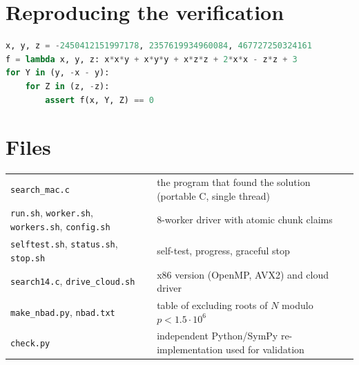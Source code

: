\documentclass[11pt]{article}
\theoremstyle{remark}
\theoremstyle{definition}
\begin{document}
\appendix
\section{Reproducing the verification}
\begin{lstlisting}[language=Python]
x, y, z = -2450412151997178, 2357619934960084, 467727250324161
f = lambda x, y, z: x*x*y + x*y*y + x*z*z + 2*x*x - z*z + 3
for Y in (y, -x - y):
    for Z in (z, -z):
        assert f(x, Y, Z) == 0
\end{lstlisting}

\section{Files}
\noindent\begin{tabular}{p{}p{}}
\texttt{search\_mac.c} & the program that found the solution (portable C, single thread)\\
\texttt{run.sh}, \texttt{worker.sh}, \texttt{workers.sh}, \texttt{config.sh} & 8-worker driver with atomic chunk claims\\
\texttt{selftest.sh}, \texttt{status.sh}, \texttt{stop.sh} & self-test, progress, graceful stop\\
\texttt{search14.c}, \texttt{drive\_cloud.sh} & x86 version (OpenMP, AVX2) and cloud driver\\
\texttt{make\_nbad.py}, \texttt{nbad.txt} & table of excluding roots of $N$ modulo $p<1.5\cdot10^6$\\
\texttt{check.py} & independent Python/SymPy re-implementation used for validation\\
\end{tabular}
\end{document}
